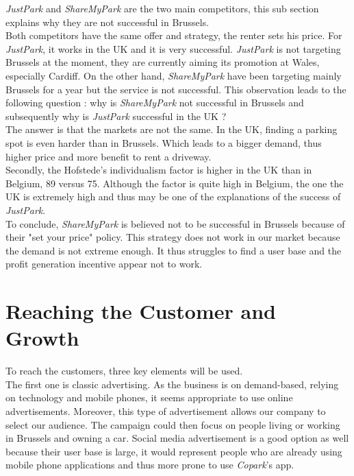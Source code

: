 \documentclass[12pt,a4paper,oneside]{book}
\newcommand{\bp}{\textit{Copark}}
\begin{document}
\textit{JustPark} and \textit{ShareMyPark} are the two main competitors, this sub section explains why they are not successful in Brussels.\\

Both competitors have the same offer and strategy, the renter sets his price. For \textit{JustPark}, it works in the UK and it is very successful. \textit{JustPark} is not targeting Brussels at the moment, they are currently aiming its promotion at Wales, especially Cardiff. On the other hand, \textit{ShareMyPark} have been targeting mainly Brussels for a year but the service is not successful. This observation leads to the following question : why is \textit{ShareMyPark} not successful in Brussels and subsequently why is \textit{JustPark} successful in the UK ?\\

The answer is that the markets are not the same. In the UK, finding a parking spot is even harder than in Brussels.\cite{londonpark} Which leads to a bigger demand, thus higher price and more benefit to rent a driveway.\\

Secondly, the Hofstede's individualism factor is higher in the UK than in Belgium, 89 versus 75.\cite{hukbe} Although the factor is quite high in Belgium, the one the UK is extremely high and thus may be one of the explanations of the success of \textit{JustPark}.\\

To conclude, \textit{ShareMyPark} is believed not to be successful in Brussels because of their "set your price" policy. This strategy does not work in our market because the demand is not extreme enough. It thus struggles to find a user base and the profit generation incentive appear not to work.

\section{Reaching the Customer and Growth}
To reach the customers, three key elements will be used.\\

The first one is classic advertising. As the business is on demand-based, relying on technology and mobile phones, it seems appropriate to use online advertisements. Moreover, this type of advertisement allows our company to select our audience. The campaign could then focus on people living or working in Brussels and owning a car. Social media advertisement is a good option as well because their user base is large, it would represent people who are already using mobile phone applications and thus more prone to use \bp{}'s app.\\
\end{document}
